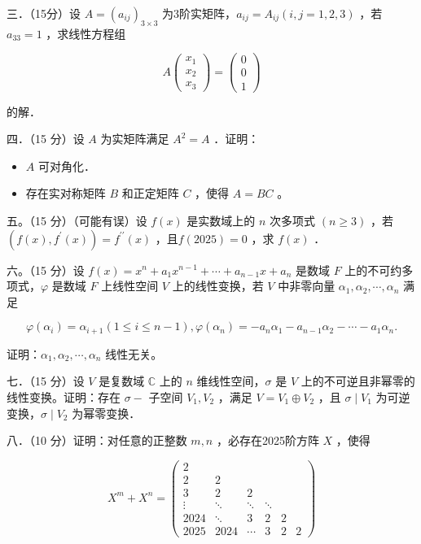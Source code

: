\documentclass{article}
\begin{document}
三．（15分）设 \(A=\left(a_{i j}\right)_{3 \times 3}\) 为3阶实矩阵，\(a_{i j}=A_{i j}(i, j=1,2,3)\) ，若 \(a_{33}=1\) ，求线性方程组

\[
A\left(\begin{array}{l}
x_{1} \\
x_{2} \\
x_{3}
\end{array}\right)=\left(\begin{array}{l}
0 \\
0 \\
1
\end{array}\right)
\]

的解．

四．（15 分）设 \(A\) 为实矩阵满足 \(A^{2}=A\) ．证明：

\begin{itemize}
  \item[（1）] \(A\) 可对角化．
  \item[（2）] 存在实对称矩阵 \(B\) 和正定矩阵 \(C\) ，使得 \(A=B C\) 。
\end{itemize}

五。（15 分）（可能有误）设 \(f(x)\) 是实数域上的 \(n\) 次多项式 \((n \geq 3)\) ，若 \(\left(f(x), f^{\prime}(x)\right)=f^{\prime \prime}(x)\) ，且\(f(2025)=0\) ，求 \(f(x)\) ．

六。（15 分）设 \(f(x)=x^{n}+a_{1} x^{n-1}+\cdots+a_{n-1} x+a_{n}\) 是数域 \(F\) 上的不可约多项式，\(\varphi\) 是数域 \(F\) 上线性空间 \(V\) 上的线性变换，若 \(V\) 中非零向量 \(\alpha_{1}, \alpha_{2}, \cdots, \alpha_{n}\) 满足

\[
\varphi\left(\alpha_{i}\right)=\alpha_{i+1}(1 \leq i \leq n-1), \varphi\left(\alpha_{n}\right)=-a_{n} \alpha_{1}-a_{n-1} \alpha_{2}-\cdots-a_{1} \alpha_{n} .
\]

证明：\(\alpha_{1}, \alpha_{2}, \cdots, \alpha_{n}\) 线性无关。

七．（15 分）设 \(V\) 是复数域 \(\mathbb{C}\) 上的 \(n\) 维线性空间，\(\sigma\) 是 \(V\) 上的不可逆且非幂零的线性变换。证明：存在 \(\sigma-\) 子空间 \(V_{1}, V_{2}\) ，满足 \(V=V_{1} \oplus V_{2}\) ，且 \(\sigma \mid V_{1}\) 为可逆变换，\(\sigma \mid V_{2}\) 为幂零变换．

八．（10 分）证明：对任意的正整数 \(m, n\) ，必存在2025阶方阵 \(X\) ，使得

\[
X^{m}+X^{n}=\left(\begin{array}{cccccc}
2 & & & & & \\
2 & 2 & & & & \\
3 & 2 & 2 & & & \\
\vdots & \ddots & \ddots & \ddots & & \\
2024 & \ddots & 3 & 2 & 2 & \\
2025 & 2024 & \cdots & 3 & 2 & 2
\end{array}\right)
\]
\end{document}
